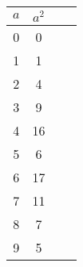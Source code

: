 
\begin{table}[H]
\centering
\begin{tabular}{c|cc|c}
$a$ & $a^2$ \\ \hline
0   & 0  \\
1   & 1  \\
2   & 4  \\
3   & 9  \\
4   & 16 \\
5   & 6  \\
6   & 17 \\
7   & 11 \\
8   & 7  \\
9   & 5
\end{tabular}
\end{table}
